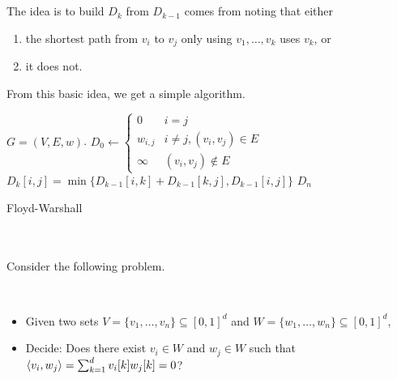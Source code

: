         \\
        \\
        The idea is to build \(D_k\) from \(D_{k-1}\) comes from noting that either
        \begin{enumerate}
            \item the shortest path from \(v_i\) to \(v_j\) only using \(v_1,\ldots,v_k\) uses \(v_k\), or 
            \item it does not.
        \end{enumerate}
        From this basic idea, we get a simple algorithm.
        \begin{algorithm}[H] 
            \begin{algorithmic}[1]
                \Require \(G=(V,E,w)\).
                    \State \(D_0\gets\begin{cases}
                        0 & i=j \\
                        w_{i,j} & i\neq j, (v_i,v_j)\in E \\
                        \infty & (v_i,v_j)\nin E
                    \end{cases}\)
                                \State \(D_{k}[i,j]=\min\{D_{k-1}[i,k]+D_{k-1}[k,j], D_{k-1}[i,j]\}\)
                            \EndFor
                        \EndFor
                    \EndFor
                    \State \Return \(D_n\)
                \EndProcedure 
            \end{algorithmic}
            \caption{Floyd-Warshall}
            \label{alg:floydwarshall}
        \end{algorithm}
        \pagebreak
        \vphantom
        \\
        \\
        Consider the following problem.
        \begin{compprob} \label{prob:ov}
            \vphantom
            \\
            \begin{itemize}
                \item Given two sets \(V=\{v_1,\ldots,v_n\}\subseteq[0,1]^d\) and \(W=\{w_1,\ldots,w_n\}\subseteq[0,1]^d\),
                \item Decide: Does there exist \(v_i\in W\) and \(w_j\in W\) such that \(\left\langle v_i,w_j\right\rangle=\sum_{k=1}^d v_i[k]w_j[k]=0\)?
            \end{itemize}
        \end{compprob}

